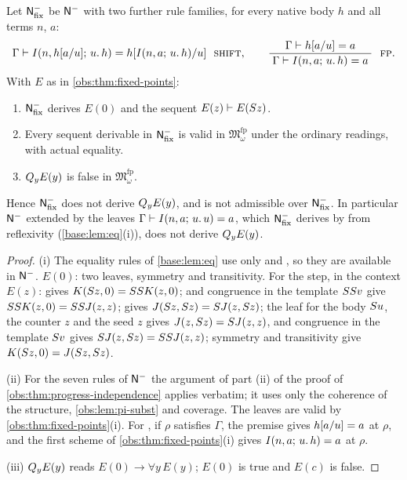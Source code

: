 \begin{corollary}
\label{obs:cor:fp-native}
Let $\mathsf{N}^{-}_{\mathrm{fix}}$ be $\mathsf{N}^{-}$ with two further rule families, for
every native body $h$ and all terms $n$, $a$:
\[
\Gamma\proves\It{n}{h\subst{a}{u}}{u}{h}=h\subst{\It{n}{a}{u}{h}}{u}
\ \ \rulename{Shift},\qquad
\infrule{\Gamma\proves h\subst{a}{u}=a}{\Gamma\proves\It{n}{a}{u}{h}=a}
\ \ \rulename{FP}.
\]
With $E$ as in \cref{obs:thm:fixed-points}:
\begin{enumerate}[label=(\roman*)]
\item $\mathsf{N}^{-}_{\mathrm{fix}}$ derives $E(0)$ and the sequent
$E(z)\vdash E(S z)$.
\item Every sequent derivable in $\mathsf{N}^{-}_{\mathrm{fix}}$ is valid in
$\mathfrak{M}^{\mathrm{fp}}_\omega$ under the ordinary readings, with actual
equality.
\item $Q_{y}E(y)$ is false in $\mathfrak{M}^{\mathrm{fp}}_\omega$.
\end{enumerate}
Hence $\mathsf{N}^{-}_{\mathrm{fix}}$ does not derive $Q_{y}E(y)$, and 
is not admissible over $\mathsf{N}^{-}_{\mathrm{fix}}$. In particular $\mathsf{N}^{-}$
extended by the leaves $\Gamma\vdash I(n,a;\,u.\,u)=a$, which
$\mathsf{N}^{-}_{\mathrm{fix}}$ derives by  from reflexivity
(\cref{base:lem:eq}(i)), does not derive $Q_{y}E(y)$.
\end{corollary}

\begin{proof}
(i) The equality rules of \cref{base:lem:eq} use only  and
, so they are available in $\mathsf{N}^{-}$. $E(0)$: two 
leaves, symmetry and transitivity. For the step, in the context $E(z)$:
 gives $K(S z,0)=SS K(z,0)$;  and
congruence in the template $SS v$ give
$SS K(z,0)=SS J(z,z)$;  gives
$J(S z,S z)=S J(z,S z)$; the  leaf for the body
$S u$, the counter $z$ and the seed $z$ gives
$J(z,S z)=S J(z,z)$, and congruence in the template $S v$ gives
$S J(z,S z)=SS J(z,z)$; symmetry and transitivity give
$K(S z,0)=J(S z,S z)$.

(ii) For the seven rules of $\mathsf{N}^{-}$ the argument of part (ii) of the proof of
\cref{obs:thm:progress-independence} applies verbatim; it uses only the
coherence of the structure, \cref{obs:lem:pi-subst} and coverage. The
 leaves are valid by \cref{obs:thm:fixed-points}(i). For
, if $\rho$ satisfies $\Gamma$, the premise gives
$h[a/u]=a$ at $\rho$, and the first scheme of
\cref{obs:thm:fixed-points}(i) gives $I(n,a;\,u.\,h)=a$ at $\rho$.

(iii) $Q_{y}E(y)$ reads $E(0)\to\forall y\,E(y)$; $E(0)$ is true and $E(c)$ is
false.
\end{proof}

